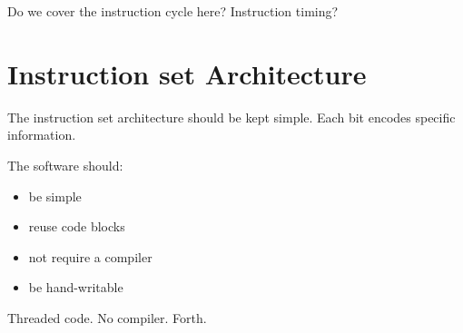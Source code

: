 Do we cover the instruction cycle here? Instruction timing?

%
\section{Instruction set Architecture}

The instruction set architecture should be kept simple. Each bit encodes specific information.

%

The software should:

\begin{itemize}
	\item be simple
        \item reuse code blocks
        \item not require a compiler
        \item be hand-writable
\end{itemize}

Threaded code. No compiler. Forth.
